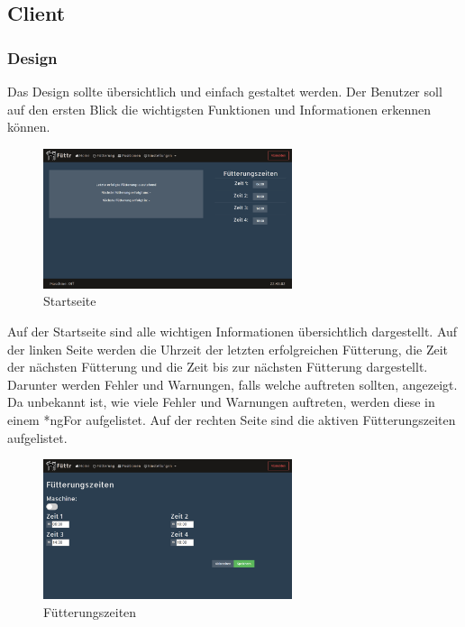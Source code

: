 \subsection{Client}
\label{sec:ums-client}

\subsubsection{Design}
\label{sec:ums-client-design}
Das Design sollte übersichtlich und einfach gestaltet werden. Der Benutzer soll auf den ersten Blick die wichtigsten Funktionen und Informationen erkennen können. \\

\begin{figure}
\vspace{-10pt}
  \begin{center}
    \includegraphics[width=0.65\textwidth]{Bilder/Greistorfer/Home}
  \end{center}
  \caption{Startseite}
  \label{Startseite}
  \vspace{-10pt}
\end{figure}

Auf der Startseite sind alle wichtigen Informationen übersichtlich dargestellt. Auf der linken Seite werden die Uhrzeit der letzten erfolgreichen Fütterung, die Zeit der nächsten Fütterung und die Zeit bis zur nächsten Fütterung dargestellt. Darunter werden Fehler und Warnungen, falls welche auftreten sollten, angezeigt. Da unbekannt ist, wie viele Fehler und Warnungen auftreten, werden diese in einem *ngFor aufgelistet. Auf der rechten Seite sind die aktiven Fütterungszeiten aufgelistet. \\

\begin{figure}
\vspace{-10pt}
  \begin{center}
    \includegraphics[width=0.65\textwidth]{Bilder/Greistorfer/Fuetterungszeiten}
  \end{center}
  \caption{Fütterungszeiten}
  \label{Fütterungszeiten}
  \vspace{-10pt}
\end{figure}

